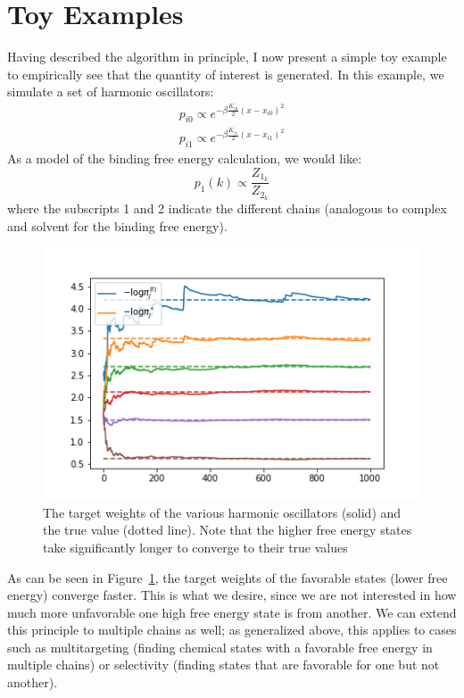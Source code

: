 \section{Toy Examples}
%
Having described the algorithm in principle, I now present a simple toy example to empirically see that the quantity of interest is generated.
%
In this example, we simulate a set of harmonic oscillators:
\begin{eqnarray}
    p_{i0} \propto e^{-\beta \frac{K_{i0}}{2} (x - x_{i0})^2} \\
    p_{i1} \propto e^{-\beta \frac{K_{i1}}{2} (x - x_{i1})^2}
\end{eqnarray}
%
As a model of the binding free energy calculation, we would like:
\begin{equation}
    p_{1}(k) \propto \frac{Z_{1_k}}{Z_{2_k}}
\end{equation}
%
\noindent where the subscripts 1 and 2 indicate the different chains (analogous to complex and solvent for the binding free energy).
%
\begin{figure}
    \centering
    \includegraphics{logpitrace_s_nosep.png}
    \caption{The target weights of the various harmonic oscillators (solid) and the true value (dotted line). Note that the higher free energy states take significantly longer to converge to their true values}
    \label{fig:toy_doublesams}
\end{figure}
%
As can be seen in Figure~\ref{fig:toy_doublesams}, the target weights of the favorable states (lower free energy) converge faster.
%
This is what we desire, since we are not interested in how much more unfavorable one high free energy state is from another.
%
We can extend this principle to multiple chains as well; as generalized above, this applies to cases such as multitargeting (finding chemical states with a favorable free energy in multiple chains) or selectivity (finding states that are favorable for one but not another). 
%
